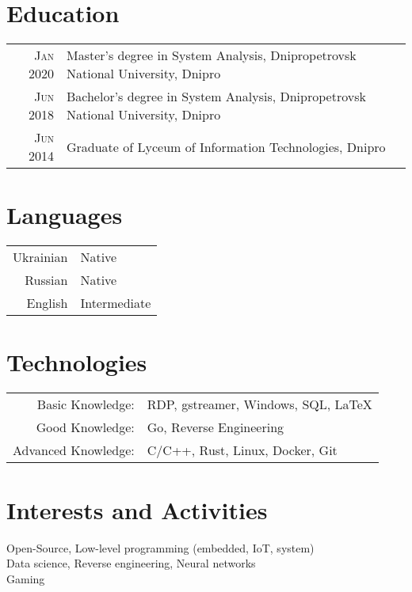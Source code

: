\documentclass[a4paper,10pt]{article}
\begin{document}
\section{Education}
\begin{tabular}{r|l}    
\textsc{Jan} 2020   & Master’s degree in System Analysis, Dnipropetrovsk National University, Dnipro \\
\textsc{Jun} 2018   & Bachelor’s degree in System Analysis, Dnipropetrovsk National University, Dnipro \\
\textsc{Jun} 2014   & Graduate of Lyceum of Information Technologies, Dnipro \\
\end{tabular}

\section{Languages}  
\begin{tabular}{r|l}
Ukrainian           & Native \\
Russian             & Native \\
English             & Intermediate \\
\end{tabular}

\section{Technologies}  
\begin{tabular}{rl}
Basic Knowledge:    & RDP, gstreamer, Windows, SQL, \LaTeX \\
Good Knowledge:     & Go, Reverse Engineering \\
Advanced Knowledge: & C/C++, Rust, Linux, Docker, Git \\
\end{tabular}

\section{Interests and Activities}  
Open-Source, Low-level programming (embedded, IoT, system) \\
Data science, Reverse engineering, Neural networks \\
Gaming
\end{document}
